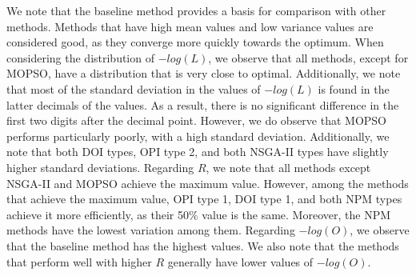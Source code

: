 We note that the baseline method provides a basis for comparison with other methods. Methods that have high mean values and low variance values are considered good, as they converge more quickly towards the optimum. When considering the distribution of $-log(L)$, we observe that all methods, except for MOPSO, have a distribution that is very close to optimal. Additionally, we note that most of the standard deviation in the values of $-log(L)$ is found in the latter decimals of the values. As a result, there is no significant difference in the first two digits after the decimal point. However, we do observe that MOPSO performs particularly poorly, with a high standard deviation. Additionally, we note that both DOI types, OPI type 2, and both NSGA-II types have slightly higher standard deviations. Regarding $R$, we note that all methods except NSGA-II and MOPSO achieve the maximum value. However, among the methods that achieve the maximum value, OPI type 1, DOI type 1, and both NPM types achieve it more efficiently, as their 50\% value is the same. Moreover, the NPM methods have the lowest variation among them. Regarding $-log(O)$, we observe that the baseline method has the highest values. We also note that the methods that perform well with higher $R$ generally have lower values of $-log(O)$.





















